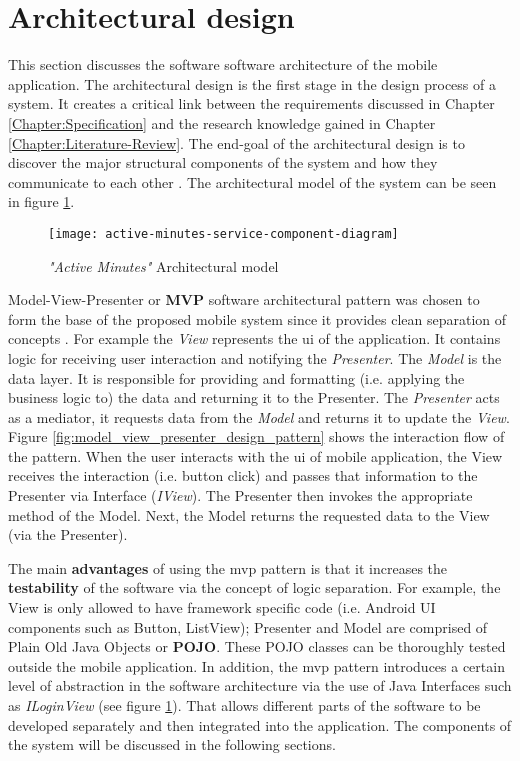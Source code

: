         
    \section{Architectural design}
    This section discusses the software software architecture of the mobile application. The architectural design is the first stage in the design process of a system. It creates a critical link between the requirements discussed in Chapter \ref{Chapter:Specification} and the research knowledge gained in Chapter \ref{Chapter:Literature-Review}. The end-goal of the architectural design is to discover the major structural components of the system and how they communicate to each other \citep[148]{sommerville2010}. The architectural model of the system can be seen in figure \ref{fig:architectural_design_component_diagram}.
    
    \begin{figure}[H]
        \centering
        \texttt{[image: active-minutes-service-component-diagram]}
        \caption{ \textit{"Active Minutes"} Architectural model}
        \label{fig:architectural_design_component_diagram}
    \end{figure}
    
    Model-View-Presenter or \textbf{MVP} software architectural pattern was chosen to form the base of the proposed mobile system since it provides clean separation of concepts \citep[532]{zhang2010}. For example the \textit{View} represents the \gls{ui} of the application. It contains logic for receiving user interaction and notifying the \textit{Presenter}. The \textit{Model} is the data layer. It is responsible for providing and formatting (i.e. applying the business logic to) the data and returning it to the Presenter. The \textit{Presenter} acts as a mediator, it requests data from the \textit{Model} and returns it to update the \textit{View}. Figure \ref{fig:model_view_presenter_design_pattern} shows the interaction flow of the pattern. When the user interacts with the \gls{ui} of mobile application, the View receives the interaction (i.e. button click) and passes that information to the Presenter via Interface (\textit{IView}). The Presenter then invokes the appropriate method of the Model. Next, the Model returns the requested data to the View (via the Presenter). 
        
    The main \textbf{advantages} of using the \gls{mvp} pattern is that it increases the \textbf{testability} of the software via the concept of logic separation. For example, the View is only allowed to have framework specific code (i.e. Android UI components such as Button, ListView); Presenter and Model are comprised of Plain Old Java Objects or \textbf{POJO}. These POJO classes can be thoroughly tested outside the mobile application. In addition, the \gls{mvp} pattern introduces a certain level of abstraction in the software architecture via the use of Java Interfaces such as \textit{ILoginView} (see figure \ref{fig:architectural_design_component_diagram}). That allows different parts of the software to be developed separately and then integrated into the application. The components of the system will be discussed in the following sections.
    
